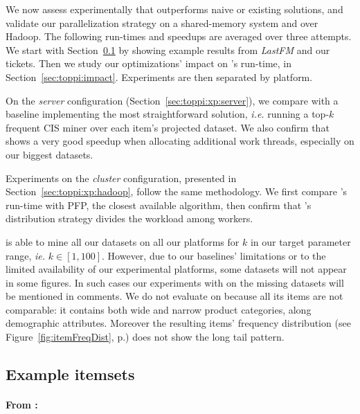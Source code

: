 We now assess experimentally that \toppi outperforms naive or existing solutions,
and validate our parallelization strategy on a shared-memory system and over Hadoop.
The following run-times and speedups are averaged over three attempts.
We start with Section~\ref{sec:quali:examples} by showing example results from {\em LastFM} and our tickets.
Then we study our optimizations' impact on \toppi's run-time, in Section~\ref{sec:toppi:impact}.
Experiments are then separated by platform.

On the {\em server} configuration (Section~\ref{sec:toppi:xp:server}),
we compare \toppi with a baseline implementing the most straightforward solution,
{\em i.e.} running a top-$k$ frequent CIS miner over each item's projected dataset.
We also confirm that \toppi shows a very good speedup
when allocating additional work threads, especially on our biggest datasets.

Experiments on the {\em cluster} configuration, presented in Section~\ref{sec:toppi:xp:hadoop},
follow the same methodology.
We first compare \toppi's run-time with PFP,
the closest available algorithm,
then confirm that \toppi's distribution strategy divides the workload among workers.


\toppi is able to mine all our datasets on all our platforms for $k$ in our target parameter range, {\em ie.} $k \in [1, 100]$.
However, due to our baselines' limitations or to the limited availability of our experimental platforms,
some datasets will not appear in some figures.
In such cases our experiments with \toppi on the missing datasets will be mentioned in comments.
We do not evaluate \toppi on \demoassoc because all its items are not comparable: it contains both wide and
narrow product categories, along demographic attributes.
Moreover the resulting items' frequency distribution (see Figure~\ref{fig:itemFreqDist}, p.\pageref{fig:itemFreqDist})
does not show the long tail pattern.




\subsection{Example itemsets}
\label{sec:quali:examples}

\paragraph{From \prodassocreceipt:}

